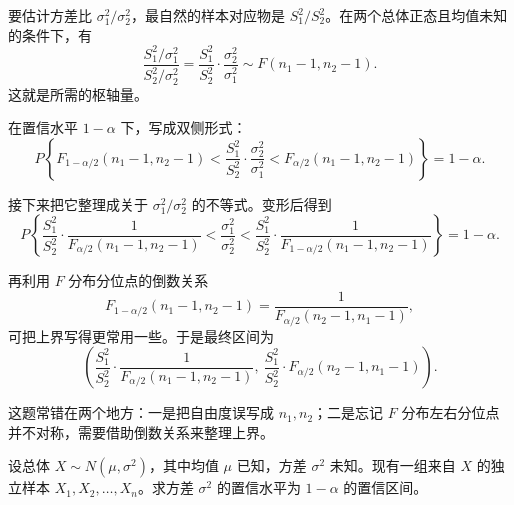 ﻿\documentclass[lang=cn,11pt]{elegantbook}
\begin{document}
\begin{solution}
要估计方差比 \(\sigma_1^2/\sigma_2^2\)，最自然的样本对应物是 \(S_1^2/S_2^2\)。在两个总体正态且均值未知的条件下，有
\[
\frac{S_1^2/\sigma_1^2}{S_2^2/\sigma_2^2}
=\frac{S_1^2}{S_2^2}\cdot\frac{\sigma_2^2}{\sigma_1^2}
\sim F(n_1-1,n_2-1).
\]
这就是所需的枢轴量。

在置信水平 \(1-\alpha\) 下，写成双侧形式：
\[
P\left\{F_{1-\alpha/2}(n_1-1,n_2-1)<\frac{S_1^2}{S_2^2}\cdot\frac{\sigma_2^2}{\sigma_1^2}<F_{\alpha/2}(n_1-1,n_2-1)\right\}=1-\alpha.
\]

接下来把它整理成关于 \(\sigma_1^2/\sigma_2^2\) 的不等式。变形后得到
\[
P\left\{\frac{S_1^2}{S_2^2}\cdot\frac{1}{F_{\alpha/2}(n_1-1,n_2-1)}
<\frac{\sigma_1^2}{\sigma_2^2}
<\frac{S_1^2}{S_2^2}\cdot\frac{1}{F_{1-\alpha/2}(n_1-1,n_2-1)}\right\}=1-\alpha.
\]

再利用 \(F\) 分布分位点的倒数关系
\[
F_{1-\alpha/2}(n_1-1,n_2-1)=\frac{1}{F_{\alpha/2}(n_2-1,n_1-1)},
\]
可把上界写得更常用一些。于是最终区间为
\[
\left(\frac{S_1^2}{S_2^2}\cdot\frac{1}{F_{\alpha/2}(n_1-1,n_2-1)},\ 
\frac{S_1^2}{S_2^2}\cdot F_{\alpha/2}(n_2-1,n_1-1)\right).
\]

\begin{note}
这题常错在两个地方：一是把自由度误写成 \(n_1,n_2\)；二是忘记 \(F\) 分布左右分位点并不对称，需要借助倒数关系来整理上界。
\end{note}
\end{solution}

\begin{exercise} \label{ex:ci_var_known_mu}
设总体 $X\sim N(\mu,\sigma^2)$，其中均值 $\mu$ 已知，方差 $\sigma^2$ 未知。现有一组来自 $X$ 的独立样本 $X_1,X_2,\dots,X_n$。求方差 $\sigma^2$ 的置信水平为 $1-\alpha$ 的置信区间。
\end{exercise}
\end{document}
